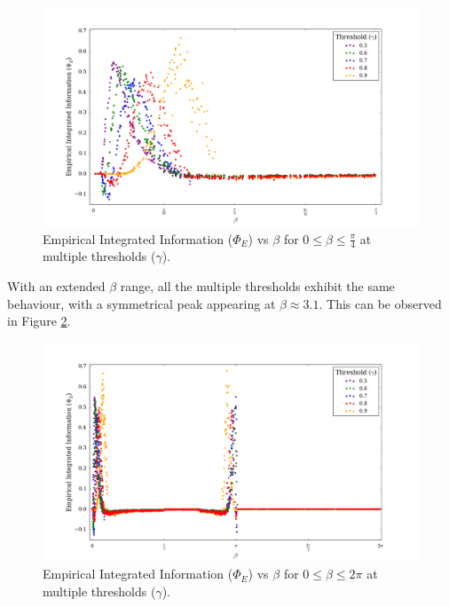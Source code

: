 \documentclass[a4paper,11pt]{article}
\begin{document}
\begin{figure}[H]
\begin{center}
\includegraphics[scale = 0.35]{figures/phi_vs_beta_orig_multi}
\caption{
	Empirical Integrated Information ($\Phi_E$) vs $\beta$ for $0 \leq \beta \leq \frac{\pi}{4}$ at multiple thresholds ($\gamma$).
	\label{fig:phi-vs-beta-orig-multi}
}
\end{center}
\end{figure}

With an extended $\beta$ range, all the multiple thresholds exhibit the same behaviour, with a symmetrical peak appearing at $\beta \approx 3.1$. This can be observed in Figure \ref{fig:phi-vs-beta-ext-multi}.

\begin{figure}[H]
\begin{center}
\includegraphics[scale = 0.35]{figures/phi_vs_beta_ext_multi}
\caption{
	Empirical Integrated Information ($\Phi_E$) vs $\beta$ for $0 \leq \beta \leq 2\pi$ at multiple thresholds ($\gamma$).
	\label{fig:phi-vs-beta-ext-multi}
}
\end{center}
\end{figure}
\end{document}
